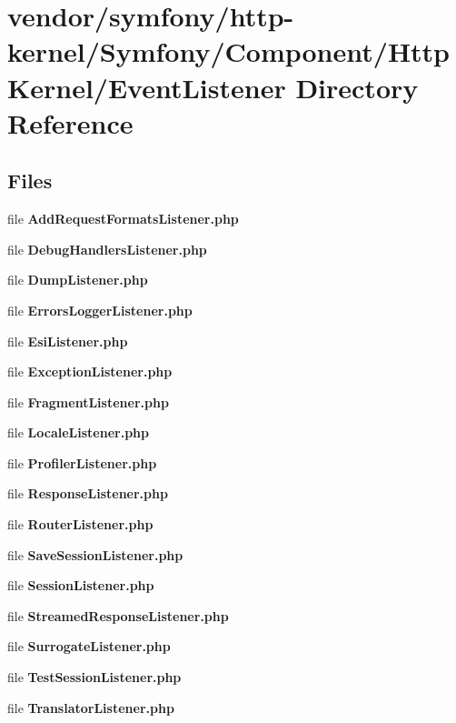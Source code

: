 \section{vendor/symfony/http-\/kernel/\+Symfony/\+Component/\+Http\+Kernel/\+Event\+Listener Directory Reference}
\label{dir_3599fda6703bfa22efde479f61300449}
\subsection*{Files}
\begin{DoxyCompactItemize}
\item 
file {\bf Add\+Request\+Formats\+Listener.\+php}
\item 
file {\bf Debug\+Handlers\+Listener.\+php}
\item 
file {\bf Dump\+Listener.\+php}
\item 
file {\bf Errors\+Logger\+Listener.\+php}
\item 
file {\bf Esi\+Listener.\+php}
\item 
file {\bf Exception\+Listener.\+php}
\item 
file {\bf Fragment\+Listener.\+php}
\item 
file {\bf Locale\+Listener.\+php}
\item 
file {\bf Profiler\+Listener.\+php}
\item 
file {\bf Response\+Listener.\+php}
\item 
file {\bf Router\+Listener.\+php}
\item 
file {\bf Save\+Session\+Listener.\+php}
\item 
file {\bf Session\+Listener.\+php}
\item 
file {\bf Streamed\+Response\+Listener.\+php}
\item 
file {\bf Surrogate\+Listener.\+php}
\item 
file {\bf Test\+Session\+Listener.\+php}
\item 
file {\bf Translator\+Listener.\+php}
\end{DoxyCompactItemize}
